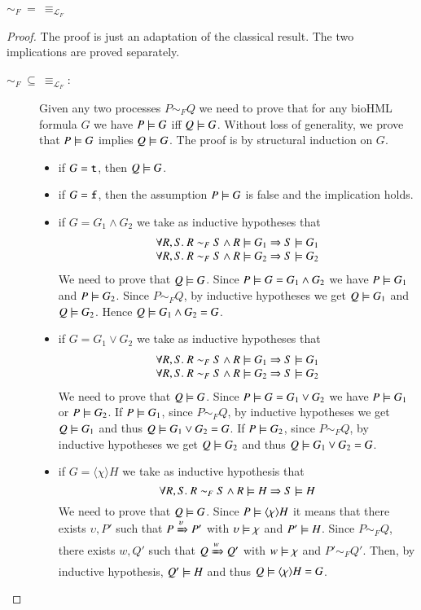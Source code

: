 \begin{theorem}
$\sim_F\ =\ \equiv_{\mathcal{L}_F}$
\end{theorem}
\begin{proof}
The proof is just an adaptation of the classical result. The two implications are proved separately.
\begin{description}
\item[$\sim_F\ \subseteq\ \equiv_{\mathcal{L}_F}$:]
Given any two processes $P\sim_F Q$ we need to prove that for any bioHML formula $G$ we have $P\models G$ iff $Q\models G$. 
Without loss of generality, we prove that $P\models G$ implies $Q\models G$.
The proof is by structural induction on $G$.
\begin{itemize}
\item 
if $G={\tt t}$, then $Q\models G$.

\item
if $G={\tt f}$, then the assumption $P\models G$ is false and the implication holds.

\item
if $G=G_1 \wedge G_2$ we take as inductive hypotheses that
$$
\begin{array}{l}
\forall R,S.\ R \sim_F S \wedge R\models G_1 \Rightarrow S \models G_1\\
\forall R,S.\ R \sim_F S \wedge R\models G_2 \Rightarrow S \models G_2
\end{array}
$$
We need to prove that $Q\models G$.
Since $P\models G=G_1 \wedge G_2$ we have $P\models G_1$ and $P\models G_2$.
Since $P\sim_F Q$, by inductive hypotheses we get $Q\models G_1$ and $Q\models G_2$.
Hence $Q\models G_1 \wedge G_2=G$.


\item
if $G=G_1 \vee G_2$  we take as inductive hypotheses that
$$
\begin{array}{l}
\forall R,S.\ R \sim_F S \wedge R\models G_1 \Rightarrow S \models G_1\\
\forall R,S.\ R \sim_F S \wedge R\models G_2 \Rightarrow S \models G_2
\end{array}
$$
We need to prove that $Q\models G$.
Since $P\models G=G_1 \vee G_2$ we have $P\models G_1$ or $P\models G_2$.
If $P\models G_1$, since $P\sim_F Q$, by inductive hypotheses we get $Q\models G_1$ and thus $Q\models G_1 \vee G_2=G$.
If $P\models G_2$, since $P\sim_F Q$, by inductive hypotheses we get $Q\models G_2$ and thus $Q\models G_1 \vee G_2=G$.

\item
if $G=\langle\chi\rangle H$ we take as inductive hypothesis that
$$
\forall R,S.\ R \sim_F S \wedge R\models H \Rightarrow S \models H
$$
We need to prove that $Q\models G$.
Since $P\models \langle\chi\rangle H$ it means that there exists $\upsilon, P'$ such that $P\xRightarrow{\upsilon} P'$ with $\upsilon\models \chi$ and $P'\models H$.
Since $P\sim_F Q$, there exists $w,Q'$ such that $Q\xRightarrow{w} Q'$ with $w\models \chi$ and $P'\sim_F Q'$. Then, by inductive hypothesis, $Q'\models H$ and thus $Q\models \langle\chi\rangle H=G$.


\end{itemize}
\end{description}
\end{proof}
